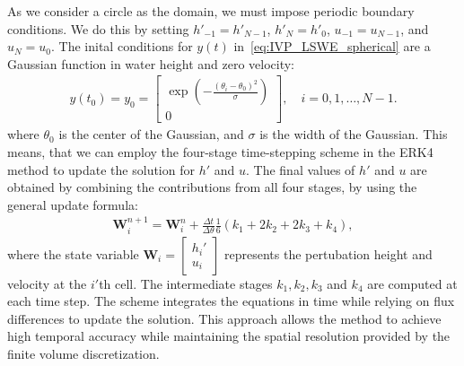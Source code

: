 As we consider a circle as the domain, we must impose periodic boundary conditions.
We do this by setting $h'_{-1} = h'_{N-1}$, $h'_{N} = h'_0$, $u_{-1} = u_{N-1}$, and $u_{N} = u_0$.
The inital conditions for $y(t)$ in~\eqref{eq:IVP_LSWE_spherical} are a Gaussian function in water height and zero velocity:
\begin{align}
    y(t_0) = y_0 = \begin{bmatrix}
        \exp(-\frac{{(\theta_{i} - \theta_0)}^2}{\sigma}) \\ 0
    \end{bmatrix}, \quad i = 0,1, \dots, N-1.
\end{align}
where $\theta_0$ is the center of the Gaussian, and $\sigma$ is the width of the Gaussian.
This means, that we can employ the four-stage time-stepping scheme in the ERK4 method to update the solution for $h'$ and $u$.
The final values of $h'$ and $u$ are obtained by combining the contributions from all four stages, by using the general update formula:
\begin{align*}
    \mathbf{W}_i^{n+1} = \mathbf{W}_i^n + \frac{\Delta t}{\Delta \theta} \frac{1}{6} \left(k_1 + 2 k_2 + 2 k_3 + k_4 \right),
\end{align*}
where the state variable
$\mathbf{W}_i = \begin{bmatrix}
    h_i' \\
    u_i
\end{bmatrix}$ represents the pertubation height and velocity at the $i'$th cell.
The intermediate stages $k_1, k_2, k_3$ and $k_4$ are computed at each time step.
The scheme integrates the equations in time while relying on flux differences to update the solution.
This approach allows the method to achieve high temporal accuracy while maintaining the spatial resolution provided by the finite volume discretization.




